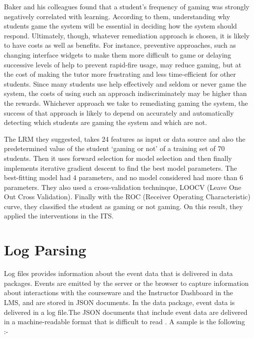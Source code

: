\documentclass[a4paper,12pt,oneside]{sphinxmanual}
\begin{document}
Baker and his colleagues found that a student’s frequency of gaming was strongly negatively correlated with learning. According to them, understanding why students game the system will be essential in deciding how the system should respond. Ultimately, though, whatever remediation approach is chosen, it is likely to have costs as well as benefits. For instance, preventive approaches, such as changing interface widgets to make them more difficult to game or delaying successive levels of help to prevent rapid-fire usage, may reduce gaming, but at the cost of making the tutor more frustrating and less time-efficient for other students. Since many students use help effectively and seldom or never game the system, the costs of using such an approach indiscriminately may be higher than the rewards. Whichever approach we take to remediating gaming the system, the success of that approach is likely to depend on accurately and automatically detecting which students are gaming the system and which are not.

The LRM they suggested, takes 24 features as input or data source and also the predetermined value of the student ‘gaming or not’ of a training set of 70 students. Then it uses forward selection for model selection and then finally implements iterative gradient descent to find the best model parameters. The best-fitting model had 4 parameters, and no model considered had more than 6 parameters. They also used a cross-validation techninque, LOOCV (Leave One Out Cross Validation). Finally with the ROC (Receiver Operating Characteristic) curve, they classified the student as gaming or not gaming. On this result, they applied the interventions in the ITS.


\chapter{\textbf{Log Parsing}}
\label{document:log-parsing}
Log files provides information about the event data that is delivered in data packages. Events are emitted by the server or the browser to capture information about interactions with the courseware and the Instructor Dashboard in the LMS, and are stored in JSON documents. In the data package, event data is delivered in a log file.The JSON documents that include event data are delivered in a machine-readable format that is difficult to read . A sample is the following :-
\end{document}
